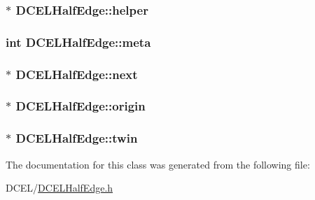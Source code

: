\subsubsection[{\texorpdfstring{helper}{helper}}]{$\ast$ D\+C\+E\+L\+Half\+Edge\+::helper}\hypertarget{classDCELHalfEdge_abb62faec9db2295a63ab07e665c826e8}{}\label{classDCELHalfEdge_abb62faec9db2295a63ab07e665c826e8}
\subsubsection[{\texorpdfstring{meta}{meta}}]{\setlength{\rightskip}{0pt plus 5cm}int D\+C\+E\+L\+Half\+Edge\+::meta}\hypertarget{classDCELHalfEdge_a42d420a68a28f72d360e145b571382d8}{}\label{classDCELHalfEdge_a42d420a68a28f72d360e145b571382d8}
\subsubsection[{\texorpdfstring{next}{next}}]{$\ast$ D\+C\+E\+L\+Half\+Edge\+::next}\hypertarget{classDCELHalfEdge_a7a2d43817186337439468eb238c6bce2}{}\label{classDCELHalfEdge_a7a2d43817186337439468eb238c6bce2}
\subsubsection[{\texorpdfstring{origin}{origin}}]{$\ast$ D\+C\+E\+L\+Half\+Edge\+::origin}\hypertarget{classDCELHalfEdge_a43a9bcc720748208b21efda5b2013c3c}{}\label{classDCELHalfEdge_a43a9bcc720748208b21efda5b2013c3c}
\subsubsection[{\texorpdfstring{twin}{twin}}]{$\ast$ D\+C\+E\+L\+Half\+Edge\+::twin}\hypertarget{classDCELHalfEdge_a26f41516925913df2666f32cfaa9a6a9}{}\label{classDCELHalfEdge_a26f41516925913df2666f32cfaa9a6a9}


The documentation for this class was generated from the following file\+:\begin{DoxyCompactItemize}
\item 
D\+C\+E\+L/\hyperlink{DCELHalfEdge_8h}{D\+C\+E\+L\+Half\+Edge.\+h}\end{DoxyCompactItemize}
